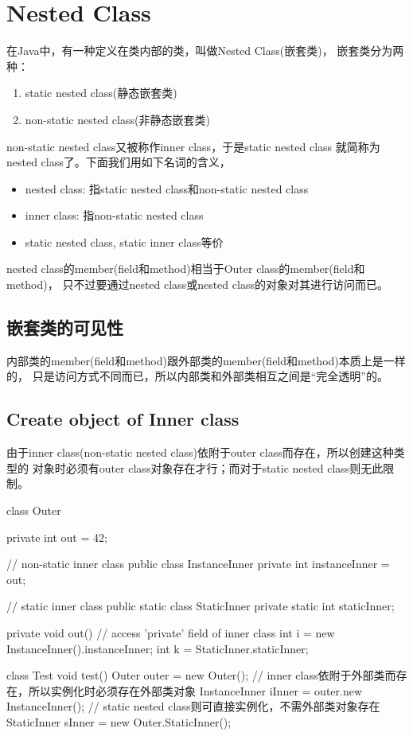 ﻿\section[Nested Class]{Nested Class}
在Java中，有一种定义在类内部的类，叫做Nested Class(嵌套类)，
嵌套类分为两种：
\begin{enumerate}
  \item static nested class(静态嵌套类)
  \item non-static nested class(非静态嵌套类)
\end{enumerate}
non-static nested class又被称作inner class，于是static nested class
就简称为nested class了。下面我们用如下名词的含义，
\begin{itemize}
  \item nested class: 指static nested class和non-static nested class
  \item inner class: 指non-static nested class
  \item static nested class, static inner class等价
\end{itemize}

nested class的member(field和method)相当于Outer class的member(field和method)，
只不过要通过nested class或nested class的对象对其进行访问而已。

\subsection[嵌套类的可见性]{嵌套类的可见性}
内部类的member(field和method)跟外部类的member(field和method)本质上是一样的，
只是访问方式不同而已，所以内部类和外部类相互之间是“完全透明”的。

\subsection[Create object of Inner class ]{Create object of Inner class}
由于inner class(non-static nested class)依附于outer class而存在，所以创建这种类型的
对象时必须有outer class对象存在才行；而对于static nested class则无此限制。

\begin{javacode}
class Outer {
  private int out = 42;

  // non-static inner class
  public class InstanceInner {
    private int instanceInner = out;
  }

  // static inner class
  public static class StaticInner {
    private static int staticInner;
  }

  private void out() {
    // access 'private' field of inner class
    int i = new InstanceInner().instanceInner;
    int k = StaticInner.staticInner;
  }
}

class Test {
  void test() {
    Outer outer = new Outer();
    // inner class依附于外部类而存在，所以实例化时必须存在外部类对象
    InstanceInner iInner = outer.new InstanceInner();
    // static nested class则可直接实例化，不需外部类对象存在
    StaticInner sInner = new Outer.StaticInner();
  }
}
\end{javacode}

